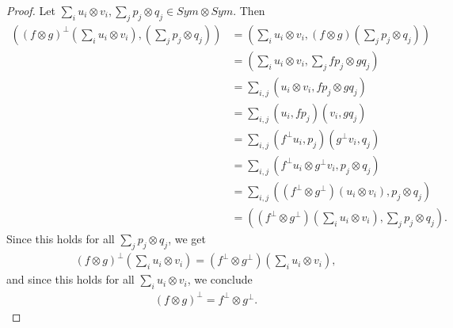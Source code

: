 \documentclass[12pt]{extarticle}
\newcommand{\<}{\langle}
\renewcommand{\>}{\rangle}
\theoremstyle{definition}
\begin{document}
\begin{proof}
  Let $\sum \limits_i u_i \otimes v_i, \sum \limits_j p_j \otimes q_j \in Sym \otimes Sym$. Then
  \begin{align*}
    ((f \otimes g)^{\perp}(\sum \limits_i u_i \otimes v_i), (\sum \limits_j p_j \otimes q_j))
    &=
    (\sum \limits_i u_i \otimes v_i, (f \otimes g)(\sum \limits_j p_j \otimes q_j)) \\
    &=
    (\sum \limits_i u_i \otimes v_i, \sum \limits_jfp_j \otimes gq_j) \\
    &=
    \sum \limits_{i,j}(u_i \otimes v_i, fp_j \otimes gq_j) \\
    &=
    \sum \limits_{i,j}(u_i, fp_j)(v_i, gq_j) \\
    &=    
    \sum \limits_{i,j}(f^{\perp}u_i, p_j)(g^{\perp}v_i, q_j) \\
    &=
    \sum \limits_{i,j}(f^{\perp}u_i \otimes g^{\perp}v_i, p_j \otimes q_j) \\
    &=
    \sum \limits_{i,j}((f^{\perp} \otimes g^{\perp})(u_i \otimes v_i), p_j \otimes q_j) \\
    &=    
    ((f^{\perp} \otimes g^{\perp})(\sum \limits_{i} u_i \otimes v_i), \sum \limits_{j} p_j \otimes q_j).
  \end{align*}
  Since this holds for all $\sum \limits_j p_j \otimes q_j$, we get
  \begin{align*}
    (f \otimes g)^{\perp}(\sum \limits_i u_i \otimes v_i) = (f^{\perp} \otimes g^{\perp}) (\sum \limits_i u_i \otimes v_i),
  \end{align*}
  and since this holds for all $\sum \limits_i u_i \otimes v_i$, we conclude
  \begin{align*}
    (f \otimes g)^{\perp} = f^{\perp} \otimes g^{\perp}.
  \end{align*}
\end{proof}
\end{document}
